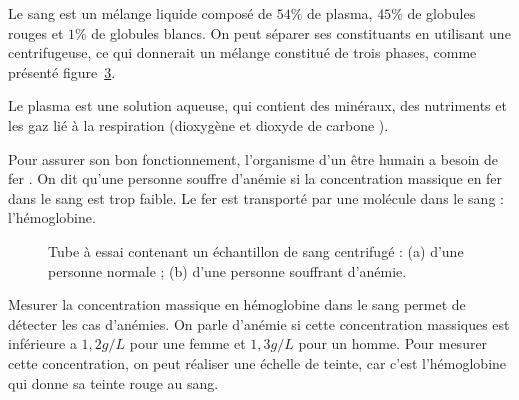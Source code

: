


Le sang est un mélange liquide composé de $54 \%$ de plasma, $45 \%$ de globules rouges et $1 \%$ de globules blancs.
On peut séparer ses constituants en utilisant une centrifugeuse, ce qui donnerait un mélange constitué de trois phases, comme présenté figure~\ref{fig:sang}.

%


Le plasma est une solution aqueuse, qui contient des minéraux, des nutriments et les gaz lié à la respiration (dioxygène  et dioxyde de carbone ).

%


Pour assurer son bon fonctionnement, l'organisme d'un être humain a besoin de fer .
On dit qu'une personne souffre d'anémie si la concentration massique en fer dans le sang est trop faible.
Le fer est transporté par une molécule dans le sang : l'hémoglobine.

\begin{figure}[!ht]
  \centering
  \begin{subfigure}{0.48\linewidth}
    \label{fig:sang_normal}
  \end{subfigure}
  \begin{subfigure}{0.48\linewidth}
    \label{fig:sang_anemie}
  \end{subfigure}
  \caption{
    \centering
    Tube à essai contenant un échantillon de sang centrifugé : (a) d'une personne normale ; (b) d'une personne souffrant d'anémie.
  }
  \label{fig:sang}
\end{figure}

%
\newpage


Mesurer la concentration massique en hémoglobine dans le sang permet de détecter les cas d'anémies.
On parle d'anémie si cette concentration massiques est inférieure a $1,\!2 \unit{g/L}$ pour une femme et $1,\!3 \unit{g/L}$ pour un homme.
Pour mesurer cette concentration, on peut réaliser une échelle de teinte, car c'est l'hémoglobine qui donne sa teinte rouge au sang.

